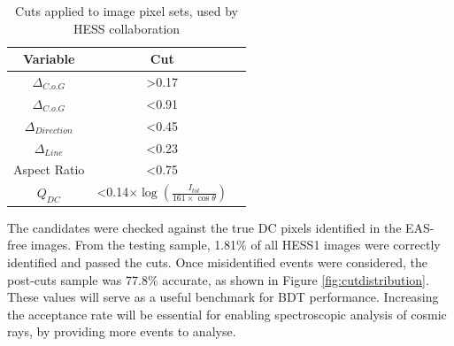 \documentclass{article}
\begin{document}
\begin{table}[h!]
  \centering
  \caption{Cuts applied to image pixel sets, used by HESS collaboration \cite{hess07}}
  \label{tab:table1}
  \begin{tabular}{ccc}
    \toprule
    Variable & Cut\\
    \midrule
     $ \Delta_{C.o.G}$ & \textgreater 0.17 \\
     $ \Delta_{C.o.G}$ & \textless 0.91 \\
     $\Delta_{Direction}$ & \textless 0.45 \\
     $\Delta_{Line}$ & \textless 0.23 \\
     Aspect Ratio & \textless 0.75 \\
     $Q_{DC}$ & \textless 0.14$ \times \log(\frac{I_{tot}}{161 \times \cos \theta})$ \\
    \bottomrule
  \end{tabular}
\end{table}

The candidates were checked against the true DC pixels identified in the EAS-free images. From the testing sample, 1.81\% of all HESS1 images were correctly identified and passed the cuts. Once misidentified events were considered, the post-cuts sample was 77.8\% accurate, as shown in Figure \ref{fig:cutdistribution}. These values will serve as a useful benchmark for BDT performance. Increasing the acceptance rate will be essential for enabling spectroscopic analysis of cosmic rays, by providing more events to analyse.
\end{document}
